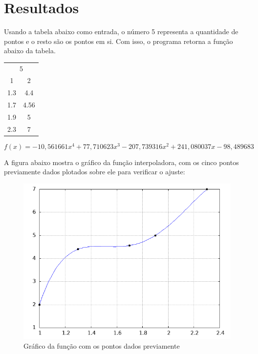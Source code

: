 \documentclass{article}
\begin{document}
\newpage
\section{Resultados}
\label{sec:resultados}
\paragraph{} Usando a tabela abaixo como entrada, o número 5 representa a quantidade de pontos e o resto são os pontos em si. Com isso, o programa retorna a função abaixo da tabela.

\begin{table}[h!]
\centering
\begin{tabular}{cc}
\multicolumn{2}{c}{5} \\
1   & 2 \\
1.3 & 4.4 \\
1.7 & 4.56 \\
1.9 & 5 \\
2.3 & 7 \\
\end{tabular}
\end{table}

\begin{equation*}
f(x) = -10{,}561661x^4 + 77{,}710623x^3 - 207{,}739316x^2 + 241{,}080037x - 98{,}489683
\end{equation*}

A figura abaixo mostra o gráfico da função interpoladora, com os cinco pontos previamente dados plotados sobre ele para verificar o ajuste:

\begin{figure}[h!]
    \centering
    \includegraphics[width=0.5\linewidth]{saida.png}
    \caption{Gráfico da função com os pontos dados previamente}
    \label{fig:saida}
\end{figure}
\end{document}
